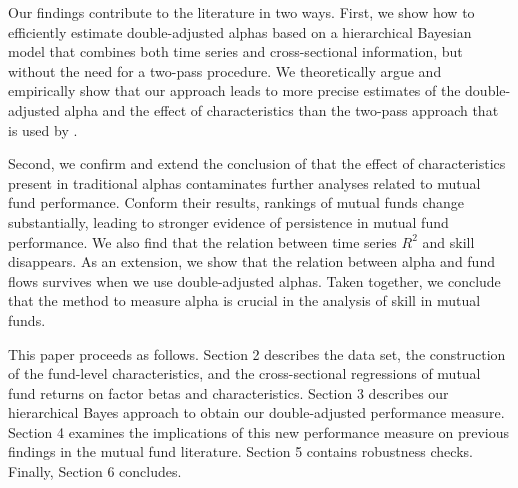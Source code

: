 Our findings contribute to the literature in two ways. First, we show how to efficiently estimate double-adjusted alphas based on a hierarchical Bayesian model that combines both time series and cross-sectional information, but without the need for a two-pass procedure. We theoretically argue and empirically show that our approach leads to more precise estimates of the double-adjusted alpha and the effect of characteristics than the two-pass approach that is used by \citet{busse2017double,chordia2015cross}.

Second, we confirm and extend the conclusion of \citet{busse2017double} that the effect of characteristics present in traditional alphas contaminates further analyses related to mutual fund performance. Conform their results, rankings of mutual funds change substantially, leading to stronger evidence of persistence in mutual fund performance. We also find that the relation between time series $R^2$ and skill disappears. As an extension, we show that the relation between alpha and fund flows survives when we use double-adjusted alphas. Taken together, we conclude that the method to measure alpha is crucial in the analysis of skill in mutual funds.

This paper proceeds as follows. Section 2 describes the data set, the construction of the fund-level characteristics, and the cross-sectional regressions of mutual fund returns on factor betas and characteristics. Section 3 describes our hierarchical Bayes approach to obtain our double-adjusted performance measure. Section 4 examines the implications of this new performance measure on previous findings in the mutual fund literature. Section 5 contains robustness checks. Finally, Section 6 concludes.

